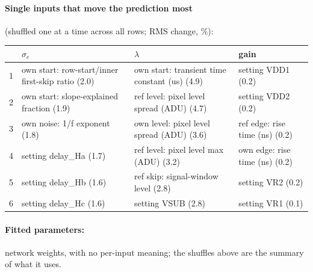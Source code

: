 \paragraph{Single inputs that move the prediction most} (shuffled one at a time across all rows; RMS change, \%):
\begin{center}\footnotesize
\begin{tabular}{rp{}p{}p{}}
\toprule
 & $\sigma_e$ & $\lambda$ & gain \\
\midrule
1 & own start: row-start/inner first-skip ratio (2.0) & own start: transient time constant (us) (4.9) & setting VDD1 (0.2) \\
2 & own start: slope-explained fraction (1.9) & ref level: pixel level spread (ADU) (4.7) & setting VDD2 (0.2) \\
3 & own noise: 1/f exponent (1.8) & own level: pixel level spread (ADU) (3.6) & ref edge: rise time (ns) (0.2) \\
4 & setting delay\_Ha (1.7) & ref level: pixel level max (ADU) (3.2) & own edge: rise time (ns) (0.2) \\
5 & setting delay\_Hb (1.6) & ref skip: signal-window level (2.8) & setting VR2 (0.2) \\
6 & setting delay\_Hc (1.6) & setting VSUB (2.8) & setting VR1 (0.1) \\
\bottomrule
\end{tabular}
\end{center}
\paragraph{Fitted parameters:} network weights, with no per-input meaning; the shuffles above are the summary of what it uses.
